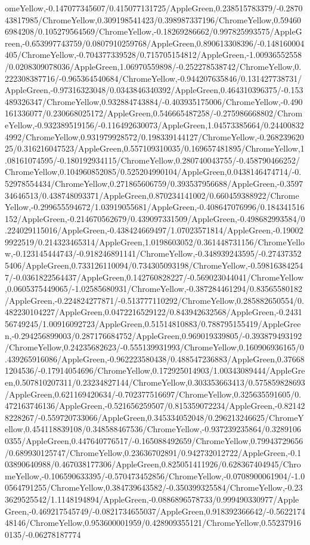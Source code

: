{\begin{tikzternal}
omeYellow,-0.147077345607/0.415077131725/AppleGreen,0.238515783379/-0.287043817985/ChromeYellow,0.309198541423/0.398987337196/ChromeYellow,0.594606984208/0.105279564569/ChromeYellow,-0.18269286662/0.997825993575/AppleGreen,-0.653997743759/0.0807910259768/AppleGreen,0.890613308396/-0.148160004405/ChromeYellow,-0.704377339528/0.715705154812/AppleGreen,-1.00936552558/0.0208309078036/AppleGreen,1.06970559898/-0.252278538742/ChromeYellow,0.222308387716/-0.965364540684/ChromeYellow,-0.944207635846/0.131427738731/AppleGreen,-0.97316323048/0.0343846340392/AppleGreen,0.464310396375/-0.153489326347/ChromeYellow,0.932884743884/-0.403935175006/ChromeYellow,-0.490161336077/0.230668025172/AppleGreen,0.546665487258/-0.275986668802/ChromeYellow,-0.932389519156/-0.116492630073/AppleGreen,1.04573385664/0.244008324992/ChromeYellow,0.931979928572/0.198339144127/ChromeYellow,-0.26823962025/0.316216047523/AppleGreen,0.557109310035/0.169657481895/ChromeYellow,1.08161074595/-0.180192934115/ChromeYellow,0.280740043755/-0.458790466252/ChromeYellow,0.104960852085/0.525204990104/AppleGreen,0.0438146474714/-0.52978554434/ChromeYellow,0.271865606759/0.393537956688/AppleGreen,-0.359734646513/0.438748093371/AppleGreen,0.870234141002/0.660459388922/ChromeYellow,-0.299655594672/1.03919055681/AppleGreen,-0.408647076996/0.184341516152/AppleGreen,-0.214670562679/0.439097331509/AppleGreen,-0.498682993584/0.224029115016/AppleGreen,-0.438424669497/1.07023571814/AppleGreen,-0.190029922519/0.214323465314/AppleGreen,1.0198603052/0.361448731156/ChromeYellow,-0.123145444743/-0.918246891141/ChromeYellow,-0.348939243595/-0.274373525406/AppleGreen,0.733126110094/0.734305093198/ChromeYellow,-0.598163842547/-0.0361822564437/AppleGreen,0.142760828227/-0.569023044041/ChromeYellow,0.0605375449065/-1.02585680931/ChromeYellow,-0.387284461294/0.83565580182/AppleGreen,-0.224824277871/-0.513777110292/ChromeYellow,0.285882650554/0.482230104227/AppleGreen,0.0472216529122/0.843942632568/AppleGreen,-0.243156749245/1.00916092723/AppleGreen,0.51514810883/0.788795155419/AppleGreen,-0.294256899003/0.287176684752/AppleGreen,0.969019339805/-0.393879493192/ChromeYellow,0.24235682623/-0.555139931993/ChromeYellow,0.160906936165/0.439265916086/AppleGreen,-0.962223580438/0.488547236883/AppleGreen,0.376681204536/-0.17914054696/ChromeYellow,0.172925014903/1.00343089444/AppleGreen,0.507810207311/0.23234827144/ChromeYellow,0.303353663413/0.575859828693/AppleGreen,0.621169420634/-0.702377516697/ChromeYellow,0.325635591605/0.472163746136/AppleGreen,-0.521656259507/0.815359072234/AppleGreen,-0.821428228267/-0.559720733066/AppleGreen,0.345334052048/0.296213246625/ChromeYellow,0.454118839108/0.348588467536/ChromeYellow,-0.937239235864/0.32891060355/AppleGreen,0.447640776517/-0.165088492659/ChromeYellow,0.79943729656/0.689930125747/ChromeYellow,0.23636702891/0.942732012722/AppleGreen,-0.103890640988/0.467038177306/AppleGreen,0.825051411926/0.628367404945/ChromeYellow,-0.106590633395/-0.570473452856/ChromeYellow,-0.0708900061904/-1.00564791255/ChromeYellow,0.384739643582/-0.350399325584/ChromeYellow,-0.233629525542/1.1148194894/AppleGreen,-0.0886896578733/0.999490330977/AppleGreen,-0.469217545749/-0.0821734655037/AppleGreen,0.918392366642/-0.562217448146/ChromeYellow,0.953600001959/0.428909355121/ChromeYellow,0.552379160135/-0.06278187774
\end{tikzternal}}
